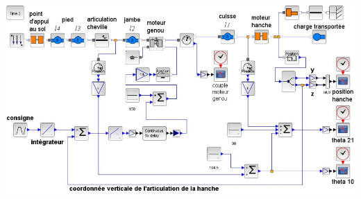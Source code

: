 \documentclass[10pt,fleqn]{article} %
\begin{document}
\begin{center}
\includegraphics[width=\linewidth]{images/fig_07}
\end{center}

\end{document}
